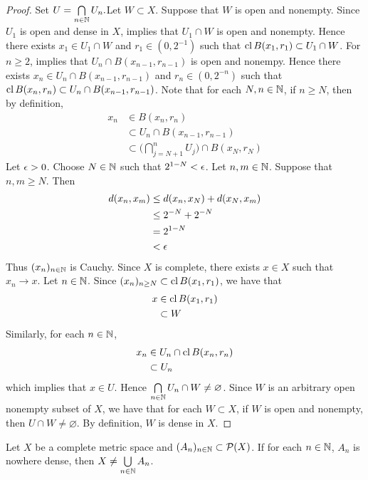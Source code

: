 \documentclass{book}
\begin{document}
\begin{proof}
	Set $U =  \bigcap\limits_{n \in \mathbb{N}} U_n. $Let $W \subset X$. Suppose that $W$ is open and nonempty. Since $U_1$ is open and dense in $X$,  implies that $U_1 \cap W$ is open and nonempty. Hence there exists $x_1 \in U_1 \cap W$ and $r_1 \in (0, 2^{-1})$ such that $\operatorname{cl} B(x_1, r_1) \subset U_1 \cap W$. For $n \geq 2$,  implies that $U_n \cap B(x_{n-1}, r_{n-1})$ is open and nonempy. Hence there exists $x_n \in U_n \cap B(x_{n-1}, r_{n-1})$ and $r_n \in (0, 2^{-n})$ such that $\operatorname{cl} B(x_n, r_n) \subset U_n \cap B(x_{n-1}, r_{n-1})$. Note that for each $N,n \in \mathbb{N}$, if $n \geq N$, then by definition,
	\begin{align*}
		x_n 
		& \in B(x_n, r_n) \\
		& \subset U_n \cap B(x_{n-1}, r_{n-1}) \\
		& \subset \bigg( \bigcap_{j=N+1}^{n} U_j \bigg) \cap B(x_N, r_N)
	\end{align*}
	Let $\epsilon > 0$. Choose $N \in \mathbb{N}$ such that $2^{1-N} < \epsilon$. Let $n, m \in \mathbb{N}$. Suppose that $n, m \geq N$. Then 
	\begin{align*}
		d(x_n, x_m)
		& \leq d(x_n, x_N) + d(x_N, x_m) \\
		& \leq 2^{-N} + 2^{-N} \\
		& = 2^{1-N} \\
		& < \epsilon 
	\end{align*}
	Thus $(x_n)_{n \in \mathbb{N}}$ is Cauchy. Since $X$ is complete, there exists $x \in X$ such that $x_n \rightarrow x$. Let $n \in \mathbb{N}$. Since $(x_n)_{n \geq N} \subset \operatorname{cl} B(x_1, r_1)$, we have that 
	\begin{align*}
		x 
		& \in \operatorname{cl} B(x_1, r_1) \\
		& \subset W
	\end{align*}
	Similarly, for each $n \in \mathbb{N}$,
	\begin{align*}
		x_n 
		& \in U_n \cap \operatorname{cl} B(x_n, r_n) \\
		& \subset U_n
	\end{align*}
	which implies that $x \in U$. Hence $\bigcap\limits_{n \in \mathbb{N}} U_n \cap W \neq \varnothing$. Since $W$ is an arbitrary open nonempty subset of $X$, we have that for each $W \subset X$, if $W$ is open and nonempty, then $ U \cap W \neq \varnothing$. By definition, $W$ is dense in $X$.
\end{proof}

\begin{ex} 
	Let $X$ be a complete metric space and $(A_n)_{n \in \mathbb{N}} \subset \mathcal{P}(X)$. If for each $n \in \mathbb{N}$, $A_n$ is nowhere dense, then $X \neq \bigcup\limits_{n \in \mathbb{N}} A_n$.   
\end{ex}
\end{document}
